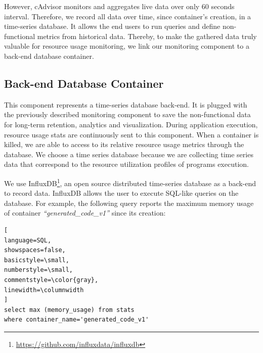 However, cAdvisor monitors and aggregates live data over only 60 seconds interval. Therefore, we record all data over time, since container's creation, in a time-series database. It allows the end users to run queries and define non-functional metrics from historical data. Thereby, to make the gathered data truly valuable for resource usage monitoring, we link our monitoring component to a back-end database container. 



\subsection{Back-end Database Container}
This component represents a time-series database back-end. It is plugged with the previously described monitoring component to save the non-functional data for long-term retention, analytics and visualization. 
During application execution, resource usage stats are continuously sent to this component. When a container is killed, we are able to access to its relative resource usage metrics through the database. We choose a time series database because we are collecting time series data that correspond to the resource utilization profiles of programs execution.

We use InfluxDB\footnote{\url{https://github.com/influxdata/influxdb}}, an open source distributed time-series database as a back-end to record data. InfluxDB allows the user to execute SQL-like queries on the database. For example, the following query reports the maximum memory usage of container \textit{``generated\_code\_v1''} since its creation:

\begin{lstlisting}[
language=SQL,
showspaces=false,
basicstyle=\small,
numberstyle=\small,
commentstyle=\color{gray},
linewidth=\columnwidth
]
select max (memory_usage) from stats 
where container_name='generated_code_v1'
\end{lstlisting}
\label{listing}

